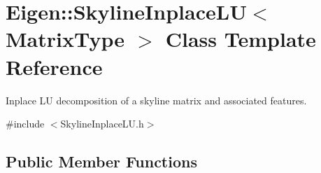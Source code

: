 \hypertarget{class_eigen_1_1_skyline_inplace_l_u}{}\section{Eigen\+:\+:Skyline\+Inplace\+LU$<$ Matrix\+Type $>$ Class Template Reference}
\label{class_eigen_1_1_skyline_inplace_l_u}


Inplace LU decomposition of a skyline matrix and associated features.  




{\ttfamily \#include $<$Skyline\+Inplace\+L\+U.\+h$>$}

\subsection*{Public Member Functions}
